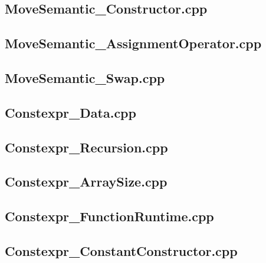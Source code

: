 \documentclass[11pt]{report}
\begin{document}
\begin{appendix}
\subsection{MoveSemantic\_Constructor.cpp}
\label{MoveSemantic_Constructor}


\subsection{MoveSemantic\_AssignmentOperator.cpp}
\label{MoveSemantic_AssignmentOperator}


\subsection{MoveSemantic\_Swap.cpp}
\label{MoveSemantic_Swap}


\subsection{Constexpr\_Data.cpp}
\label{Constexpr_Data}


\subsection{Constexpr\_Recursion.cpp}
\label{Constexpr_Recursion}


\subsection{Constexpr\_ArraySize.cpp}
\label{Constexpr_ArraySize}


\subsection{Constexpr\_FunctionRuntime.cpp}
\label{Constexpr_FunctionRuntime}


\subsection{Constexpr\_ConstantConstructor.cpp}
\label{Constexpr_ConstantConstructor}



\end{appendix}
\end{document}

